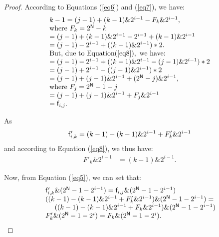 \documentclass[conference]{IEEEtran}
\begin{document}
\begin{proof}
According to Equations (\ref{eq6}) and (\ref{eq7}), we have:
\begin{equation}
\label{eq8}
\begin{array}{ll}
k-1=(j-1)+(k-1)\&2^{i-1}-F_k\&2^{i-1}, \\
\text{where } F_k=2^\mathsf{N}-k \\
 =(j-1)+(k-1)\&2^{i-1}-2^{i-1}+(k-1)\&2^{i-1}\\
 =(j-1)-2^{i-1}+((k-1)\&2^{i-1})*2. \\
\text{But, due to Equation} (\ref{eq8}), \text{ we have:} \\
 =(j-1)-2^{i-1}+((k-1)\&2^{i-1}-(j-1)\&2^{i-1})*2 \\
 =(j-1)+2^{i-1}-((j-1)\&2^{i-1})*2 \\
 =(j-1)+(j-1)\&2^{i-1}+(2^\mathsf{N}-j)\&2^{i-1},\\
\text{where } F_j=2^\mathsf{N}-1-j \\
 =(j-1)+(j-1)\&2^{i-1}+F_j\&2^{i-1} \\
 =\mathsf{f}_{i,j}.
\end{array}
\end{equation}

As
\begin{equation}
\mathsf{f}'_{i,k}=(k-1)-(k-1)\&2^{i-1}+F'_k\&2^{i-1}\\
\end{equation}
and according to Equation (\ref{eq8}), we thus have:
\begin{equation}
\label{eq9}
\begin{array}{ll}
F'_k\&2^{i-1} &=(k-1)\&2^{i-1}.
\end{array}
\end{equation} 

Now, from Equation (\ref{eq5}), we can set that:
\begin{equation}
\label{eq10}
\begin{array}{lr}
\mathsf{f}'_{i,k}\&(2^\mathsf{N}-1-2^{i-1})=\mathsf{f}_{i,j}\&(2^\mathsf{N}-1-2^{i-1}) \\
\multicolumn{2}{l}{((k-1)-(k-1)\&2^{i-1}+F'_k\&2^{i-1})\&(2^\mathsf{N}-1-2^{i-1})=}\\
~~~~((k-1)-(k-1)\&2^{i-1}+F_k\&2^{i-1})\&(2^\mathsf{N}-1-2^{i-1}) \\
F'_k\&(2^\mathsf{N}-1-2^i)=F_k\&(2^\mathsf{N}-1-2^i).\\
\end{array}
\end{equation}


\end{proof}
\end{document}
